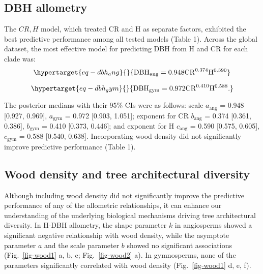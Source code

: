 \documentclass[
  12pt,
  letterpaper,
  DIV=11,
  numbers=noendperiod]{scrartcl}
\begin{document}
\hypertarget{dbh-allometry}{%
\subsection{DBH allometry}\label{dbh-allometry}}

The \(CR,H\) model, which treated CR and H as separate factors,
exhibited the best predictive performance among all tested models (Table
1). Across the global dataset, the most effective model for predicting
DBH from H and CR for each clade was:
\begin{equation}\protect\hypertarget{eq-dbh_ang}{}{
\mathrm{DBH_{ang}} = \mathrm{0.948}
\mathrm{CR}^{\text{0.374}}
\mathrm{H}^{\text{0.590}}
}\label{eq-dbh_ang}\end{equation}

\begin{equation}\protect\hypertarget{eq-dbh_gym}{}{
\mathrm{DBH_{gym}} = \mathrm{0.972}
\mathrm{CR}^{\text{0.410}}
\mathrm{H}^{\text{0.588}}.
}\label{eq-dbh_gym}\end{equation}

The posterior medians with their 95\% CIs were as follows: scale
\(a_{\text{ang}}\) = 0.948 {[}0.927, 0.969{]}, \(a_{\text{gym}}\) =
0.972 {[}0.903, 1.051{]}; exponent for CR \(b_{\text{ang}}\) = 0.374
{[}0.361, 0.386{]}, \(b_{\text{gym}}\) = 0.410 {[}0.373, 0.446{]}; and
exponent for H \(c_{\text{ang}}\) = 0.590 {[}0.575, 0.605{]},
\(c_{\text{gym}}\) = 0.588 {[}0.540, 0.638{]}. Incorporating wood
density did not significantly improve predictive performance (Table 1).

\hypertarget{wood-density-and-tree-architectural-diversity}{%
\subsection{Wood density and tree architectural
diversity}\label{wood-density-and-tree-architectural-diversity}}

Although including wood density did not significantly improve the
predictive performance of any of the allometric relationships, it can
enhance our understanding of the underlying biological mechanisms
driving tree architectural diversity. In H-DBH allometry, the shape
parameter \(k\) in angiosperms showed a significant negative
relationship with wood density, while the asymptote parameter \(a\) and
the scale parameter \(b\) showed no significant associations
(Fig.~\ref{fig-wood1} a, b, c; Fig.~\ref{fig-wood2} a). In gymnosperms,
none of the parameters significantly correlated with wood density
(Fig.~\ref{fig-wood1} d, e, f).
\end{document}
